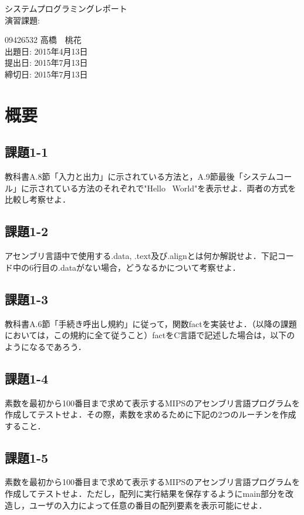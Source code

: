 \documentclass[9pt]{jarticle}
\begin{document}
\begin{center}
\begin{large}
システムプログラミングレポート \\
演習課題:  \\
\end{large}
09426532 高橋　桃花 \\
出題日: 2015年4月13日　\\
提出日: 2015年7月13日　\\
締切日: 2015年7月13日　\\
\end{center}

\section{概要}


\subsection{課題1-1}
教科書A.8節「入力と出力」に示されている方法と，A.9節最後「システムコール」に示されている方法のそれぞれで"Hello \ World"を表示せよ．両者の方式を比較し考察せよ．

\subsection{課題1-2}
アセンブリ言語中で使用する.data, .text及び.alignとは何か解説せよ．下記コード中の6行目の.dataがない場合，どうなるかについて考察せよ．

\subsection{課題1-3}
教科書A.6節「手続き呼出し規約」に従って，関数factを実装せよ．（以降の課題においては，この規約に全て従うこと）factをC言語で記述した場合は，以下のようになるであろう．

\subsection{課題1-4}
素数を最初から100番目まで求めて表示するMIPSのアセンブリ言語プログラムを作成してテストせよ．その際，素数を求めるために下記の2つのルーチンを作成すること．

\subsection{課題1-5}
素数を最初から100番目まで求めて表示するMIPSのアセンブリ言語プログラムを作成してテストせよ．ただし，配列に実行結果を保存するようにmain部分を改造し，ユーザの入力によって任意の番目の配列要素を表示可能にせよ．
\end{document}

